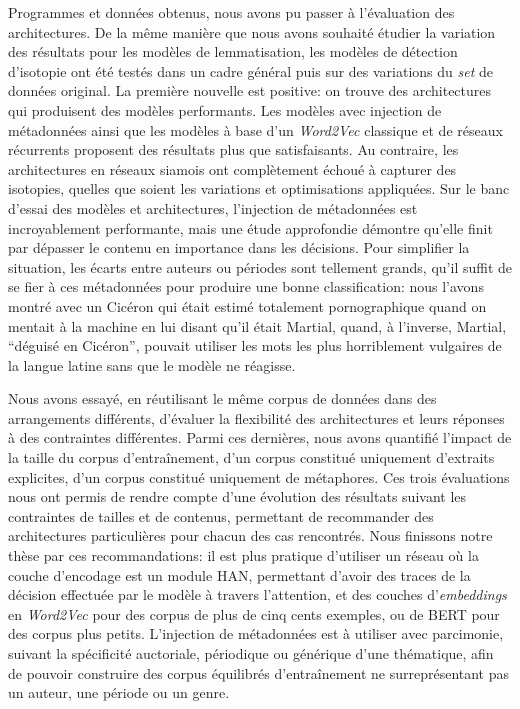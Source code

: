Programmes et données obtenus, nous avons pu passer à l'évaluation des architectures. De la même manière que nous avons souhaité étudier la variation des résultats pour les modèles de lemmatisation, les modèles de détection d'isotopie ont été testés dans un cadre général puis sur des variations du \textit{set} de données original. La première nouvelle est positive: on trouve des architectures qui produisent des modèles performants. Les modèles avec injection de métadonnées ainsi que les modèles à base d'un \textit{Word2Vec} classique et de réseaux récurrents proposent des résultats plus que satisfaisants. Au contraire, les architectures en réseaux siamois ont complètement échoué à capturer des isotopies, quelles que soient les variations et optimisations appliquées. Sur le banc d'essai des modèles et architectures, l'injection de métadonnées est incroyablement performante, mais une étude approfondie démontre qu'elle finit par dépasser le contenu en importance dans les décisions. Pour simplifier la situation, les écarts entre auteurs ou périodes sont tellement grands, qu'il suffit de se fier à ces métadonnées pour produire une bonne classification: nous l'avons montré avec un Cicéron qui était estimé totalement pornographique quand on mentait à la machine en lui disant qu'il était Martial, quand, à l'inverse, Martial, \enquote{déguisé en Cicéron}, pouvait utiliser les mots les plus horriblement vulgaires de la langue latine sans que le modèle ne réagisse.

Nous avons essayé, en réutilisant le même corpus de données dans des arrangements différents, d'évaluer la flexibilité des architectures et leurs réponses à des contraintes différentes. Parmi ces dernières, nous avons quantifié l'impact de la taille du corpus d'entraînement, d'un corpus constitué uniquement d'extraits explicites, d'un corpus constitué uniquement de métaphores. Ces trois évaluations nous ont permis de rendre compte d'une évolution des résultats suivant les contraintes de tailles et de contenus, permettant de recommander des architectures particulières pour chacun des cas rencontrés. Nous finissons notre thèse par ces recommandations: il est plus pratique d'utiliser un réseau où la couche d'encodage est un module HAN, permettant d'avoir des traces de la décision effectuée par le modèle à travers l'attention, et des couches d'\textit{embeddings} en \textit{Word2Vec} pour des corpus de plus de cinq cents exemples, ou de BERT pour des corpus plus petits. L'injection de métadonnées est à utiliser avec parcimonie, suivant la spécificité auctoriale, périodique ou générique d'une thématique, afin de pouvoir construire des corpus équilibrés d'entraînement ne surreprésentant pas un auteur, une période ou un genre.

